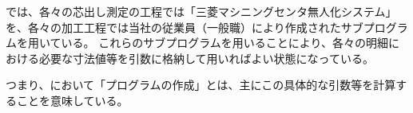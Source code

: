 

\MMname では、各々の芯出し測定の工程では「三菱マシニングセンタ無人化システム」を、各々の加工工程では当社の従業員（一般職）により作成されたサブプログラムを用いている。
これらのサブプログラムを用いることにより、各々の明細における必要な寸法値等を引数に格納して用いればよい状態になっている。
\begin{marker}
つまり、\MMname において「プログラムの作成」とは、主にこの具体的な引数等を計算することを意味している。
\end{marker}



